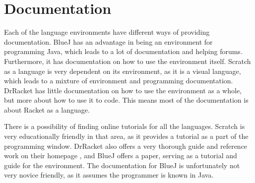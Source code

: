 \section{Documentation}
\label{sec:documentation}
Each of the language environments have different ways of providing documentation. BlueJ has an advantage in being an environment for programming Java, which leads to a lot of documentation and helping forums. Furthermore, it has documentation on how to use the environment itself. Scratch as a language is very dependent on its environment, as it is a visual language, which leads to a mixture of environment and programming documentation. DrRacket has little documentation on how to use the environment as a whole, but more about how to use it to code. This means most of the documentation is about Racket as a language.

There is a possibility of finding online tutorials for all the languages. Scratch is very educationally friendly in that area, as it provides a tutorial as a part of the programming window. DrRacket also offers a very thorough guide and reference work on their homepage \cite{racket_doc}, and BlueJ offers a paper, serving as a tutorial and guide for the environment\cite{bluej_tutorial}. The documentation for BlueJ is unfortunately not very novice friendly, as it assumes the programmer is known in Java.